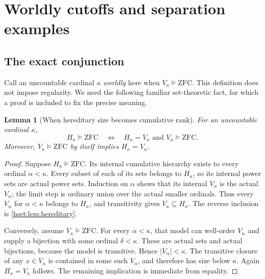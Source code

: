 \documentclass[11pt,letterpaper]{article}
\newtheorem{lemma}[lemma]{Lemma}\aliascntresetthe{lemma}
\theoremstyle{definition}
\theoremstyle{remark}
\newcommand{\card}[1]{\lvert#1\rvert}
\begin{document}
\section{Worldly cutoffs and separation examples}
\label{hset:sec:worldly}

\subsection{The exact conjunction}

Call an uncountable cardinal $\kappa$ \emph{worldly} here when
$V_\kappa\models\mathrm{ZFC}$. This definition does not impose regularity.
We need the following familiar set-theoretic fact, for which a proof is
included to fix the precise meaning.

\begin{lemma}[When hereditary size becomes cumulative rank]
\label{hset:lem:worldly-HV}
For an uncountable cardinal $\kappa$,
\[
 H_\kappa\models\mathrm{ZFC}
 \quad\Longleftrightarrow\quad
 H_\kappa=V_\kappa\text{ and }V_\kappa\models\mathrm{ZFC}.
\]
Moreover, $V_\kappa\models\mathrm{ZFC}$ by itself implies
$H_\kappa=V_\kappa$.
\end{lemma}
\begin{proof}
Suppose $H_\kappa\models\mathrm{ZFC}$. Its internal cumulative hierarchy
exists to every ordinal $\alpha<\kappa$. Every subset of each of its sets
belongs to $H_\kappa$, so its internal power sets are actual power sets.
Induction on $\alpha$ shows that its internal $V_\alpha$ is the actual
$V_\alpha$; the limit step is ordinary union over the actual smaller
ordinals. Thus every $V_\alpha$ for $\alpha<\kappa$ belongs to $H_\kappa$,
and transitivity gives $V_\kappa\subseteq H_\kappa$.
The reverse inclusion is \cref{hset:lem:hereditary}.

Conversely, assume $V_\kappa\models\mathrm{ZFC}$. For every
$\alpha<\kappa$, that model can well-order $V_\alpha$ and supply a bijection
with some ordinal $\delta<\kappa$. These are actual sets and actual
bijections, because the model is transitive. Hence
$\card{V_\alpha}<\kappa$. The transitive closure of any
$x\in V_\kappa$ is contained in some such $V_\alpha$, and therefore has
size below $\kappa$. Again $H_\kappa=V_\kappa$ follows. The remaining
implication is immediate from equality.
\end{proof}
\end{document}
